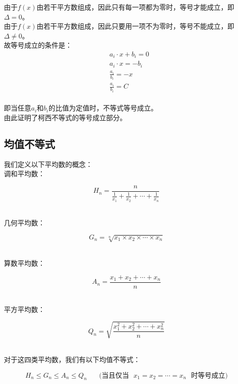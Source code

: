 \documentclass[UTF8]{ctexart}
\begin{document}
\newpage

    由于$f(x)$由若干平方数组成，因此只有每一项都为零时，等号才能成立，即$\Delta=0$。\\[3mm]
    由于$f(x)$由若干平方数组成，因此只要用一项不为零时，等号不能成立，即$\Delta\neq 0$。\\[3mm]
    故等号成立的条件是：
    \begin{align}
        &a_i\cdot x+b_i=0\\[3mm]
        &a_i\cdot x=-b_i\\[3mm]
        &\frac{a_i}{b_i}=-x\\[3mm]
        &\frac{a_i}{b_i}=C
    \end{align}\\
    即当任意$a_i$和$b_i$的比值为定值时，不等式等号成立。\\[3mm]
    由此证明了柯西不等式的等号成立部分。

\newpage

\subsection{均值不等式}
    我们定义以下平均数的概念：\\[3mm]
    调和平均数：
    \begin{large}
        \begin{equation*}
            H_n=\frac{n}{\frac{1}{x_1}+\frac{1}{x_2}+\cdots+\frac{1}{x_n}}
        \end{equation*}
    \end{large}\\
    几何平均数：
    \begin{large}
        \begin{equation*}
            G_n=\sqrt[n]{x_1\times x_2\times \cdots \times x_n}
        \end{equation*}
    \end{large}\\
    算数平均数：
    \begin{large}
        \begin{equation*}
            A_n=\frac{x_1+x_2+\cdots+x_n}{n}
        \end{equation*}
    \end{large}\\
    平方平均数：
    \begin{large}
        \begin{equation*}
            Q_n=\sqrt{\frac{x_1^2+x_2^2+\cdots+x_n^2}{n}}
        \end{equation*}
    \end{large}\\[2mm]
    对于这四类平均数，我们有以下均值不等式：
    \begin{large}
        \begin{equation*}
            H_n\le G_n\le A_n\le Q_n~~~~~~~~\text{(当且仅当~~}x_1=x_2=\cdots=x_n\text{~~时等号成立)}
        \end{equation*}
    \end{large}
\end{document}
